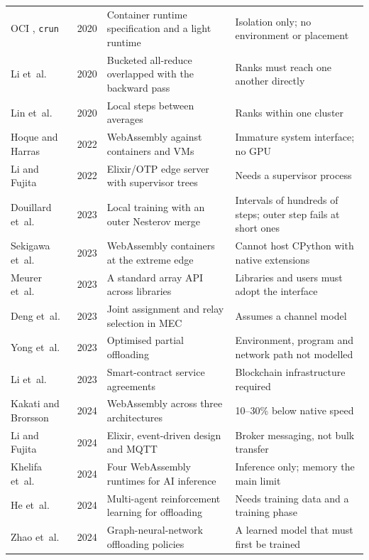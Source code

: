 {\begin{longtable}{L{2.8cm} C{0.75cm} L{4.85cm} L{4.85cm}}
OCI \cite{oci2021}, \texttt{crun} \cite{crun} & 2020 & Container runtime specification and a light runtime & Isolation only; no environment or placement \\
Li et~al.\ \cite{li2020pytorchddp} & 2020 & Bucketed all-reduce overlapped with the backward pass & Ranks must reach one another directly \\
Lin et~al.\ \cite{lin2020localsgd} & 2020 & Local steps between averages & Ranks within one cluster \\
Hoque and Harras \cite{hoque2022} & 2022 & WebAssembly against containers and VMs & Immature system interface; no GPU \\
Li and Fujita \cite{li2023elixir} & 2022 & Elixir/OTP edge server with supervisor trees & Needs a supervisor process \\
Douillard et~al.\ \cite{douillard2023diloco} & 2023 & Local training with an outer Nesterov merge & Intervals of hundreds of steps; outer step fails at short ones \\
Sekigawa et~al.\ \cite{sekigawa2023} & 2023 & WebAssembly containers at the extreme edge & Cannot host CPython with native extensions \\
Meurer et~al.\ \cite{arrayapi2023} & 2023 & A standard array API across libraries & Libraries and users must adopt the interface \\
Deng et~al.\ \cite{deng2023} & 2023 & Joint assignment and relay selection in MEC & Assumes a channel model \\
Yong et~al.\ \cite{yong2023} & 2023 & Optimised partial offloading & Environment, program and network path not modelled \\
Li et~al.\ \cite{li2023blockchain} & 2023 & Smart-contract service agreements & Blockchain infrastructure required \\
Kakati and Brorsson \cite{kakati2024} & 2024 & WebAssembly across three architectures & 10--30\% below native speed \\
Li and Fujita \cite{zhou2024} & 2024 & Elixir, event-driven design and MQTT & Broker messaging, not bulk transfer \\
Khelifa et~al.\ \cite{khelifa2024} & 2024 & Four WebAssembly runtimes for AI inference & Inference only; memory the main limit \\
He et~al.\ \cite{he2024} & 2024 & Multi-agent reinforcement learning for offloading & Needs training data and a training phase \\
Zhao et~al.\ \cite{zhao2023} & 2024 & Graph-neural-network offloading policies & A learned model that must first be trained \\

\end{longtable}}

